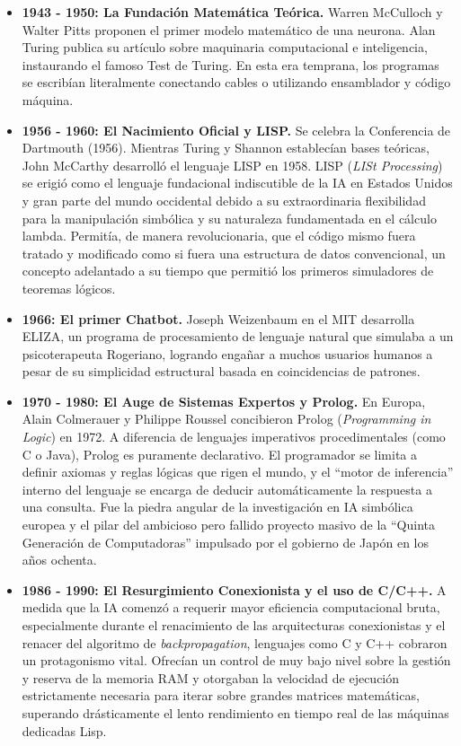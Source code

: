 \documentclass[12pt,letterpaper]{article}
\begin{document}
\begin{itemize}
    \item \textbf{1943 - 1950: La Fundación Matemática Teórica.} Warren McCulloch y Walter Pitts proponen el primer modelo matemático de una neurona. Alan Turing publica su artículo sobre maquinaria computacional e inteligencia, instaurando el famoso Test de Turing. En esta era temprana, los programas se escribían literalmente conectando cables o utilizando ensamblador y código máquina.
    
    \item \textbf{1956 - 1960: El Nacimiento Oficial y LISP.} Se celebra la Conferencia de Dartmouth (1956). Mientras Turing y Shannon establecían bases teóricas, John McCarthy desarrolló el lenguaje LISP en 1958. LISP (\textit{LISt Processing}) se erigió como el lenguaje fundacional indiscutible de la IA en Estados Unidos y gran parte del mundo occidental debido a su extraordinaria flexibilidad para la manipulación simbólica y su naturaleza fundamentada en el cálculo lambda. Permitía, de manera revolucionaria, que el código mismo fuera tratado y modificado como si fuera una estructura de datos convencional, un concepto adelantado a su tiempo que permitió los primeros simuladores de teoremas lógicos.
    
    \item \textbf{1966: El primer Chatbot.} Joseph Weizenbaum en el MIT desarrolla ELIZA, un programa de procesamiento de lenguaje natural que simulaba a un psicoterapeuta Rogeriano, logrando engañar a muchos usuarios humanos a pesar de su simplicidad estructural basada en coincidencias de patrones.
    
    \item \textbf{1970 - 1980: El Auge de Sistemas Expertos y Prolog.} En Europa, Alain Colmerauer y Philippe Roussel concibieron Prolog (\textit{Programming in Logic}) en 1972. A diferencia de lenguajes imperativos procedimentales (como C o Java), Prolog es puramente declarativo. El programador se limita a definir axiomas y reglas lógicas que rigen el mundo, y el ``motor de inferencia'' interno del lenguaje se encarga de deducir automáticamente la respuesta a una consulta. Fue la piedra angular de la investigación en IA simbólica europea y el pilar del ambicioso pero fallido proyecto masivo de la ``Quinta Generación de Computadoras'' impulsado por el gobierno de Japón en los años ochenta.
    
    \item \textbf{1986 - 1990: El Resurgimiento Conexionista y el uso de C/C++.} A medida que la IA comenzó a requerir mayor eficiencia computacional bruta, especialmente durante el renacimiento de las arquitecturas conexionistas y el renacer del algoritmo de \textit{backpropagation}, lenguajes como C y C++ cobraron un protagonismo vital. Ofrecían un control de muy bajo nivel sobre la gestión y reserva de la memoria RAM y otorgaban la velocidad de ejecución estrictamente necesaria para iterar sobre grandes matrices matemáticas, superando drásticamente el lento rendimiento en tiempo real de las máquinas dedicadas Lisp.
    

\end{itemize}
\end{document}
